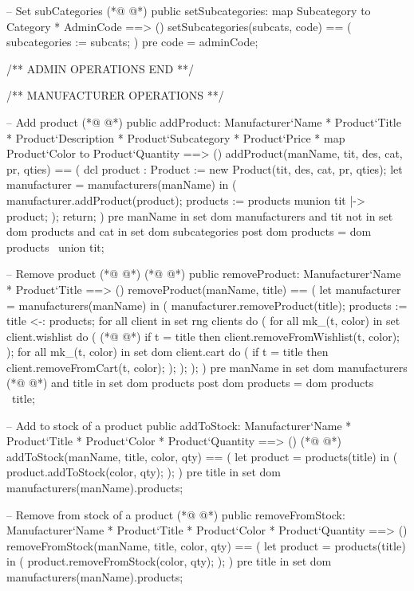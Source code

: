 \begin{vdmpp}[breaklines=true]
 -- Set subCategories
(*@
\label{setSubcategories:75}
@*)
 public setSubcategories: map Subcategory to Category * AdminCode ==> ()
 setSubcategories(subcats, code) == (
  subcategories := subcats;
 )
 pre code = adminCode;
 
 /** ADMIN OPERATIONS END **/
 
 
 /** MANUFACTURER OPERATIONS **/
 
 -- Add product
(*@
\label{addProduct:87}
@*)
 public addProduct: Manufacturer`Name * Product`Title * Product`Description * Product`Subcategory * Product`Price * map Product`Color to Product`Quantity ==> ()
 addProduct(manName, tit, des, cat, pr, qties) == (
  dcl product : Product := new Product(tit, des, cat, pr, qties);
  let manufacturer = manufacturers(manName)
   in (
    manufacturer.addProduct(product);
    products := products munion {tit |-> product};
   );
   return;
 )
 pre manName in set dom manufacturers
  and tit not in set dom products
  and cat in set dom subcategories
 post dom products = dom products~ union {tit};
 
 -- Remove product
(*@
\label{removeProduct:103}
@*)
(*@
\label{addToStock:103}
@*)
 public removeProduct: Manufacturer`Name * Product`Title ==> ()
 removeProduct(manName, title) == (
  let manufacturer = manufacturers(manName)
   in (
    manufacturer.removeProduct(title);
    products := {title} <-: products;
    for all client in set rng clients
    do (
     for all mk_(t, color) in set client.wishlist
     do (
(*@
\label{removeFromStock:113}
@*)
      if t = title then client.removeFromWishlist(t, color);
     );
     for all mk_(t, color) in set dom client.cart
     do (
      if t = title then client.removeFromCart(t, color);
     );
    );
  );
 )
 pre manName in set dom manufacturers
(*@
\label{setVolumeDiscounts:123}
@*)
  and title in set dom products
 post dom products = dom products~ \ {title};
 
 -- Add to stock of a product
 public addToStock: Manufacturer`Name * Product`Title * Product`Color * Product`Quantity ==> ()
(*@
\label{addToWishlist:128}
@*)
 addToStock(manName, title, color, qty) == (
  let product = products(title)
  in (
   product.addToStock(color, qty);
  );
 )
 pre title in set dom manufacturers(manName).products;
 
 -- Remove from stock of a product
(*@
\label{removeFromWishlist:137}
@*)
 public removeFromStock: Manufacturer`Name * Product`Title * Product`Color * Product`Quantity ==> ()
 removeFromStock(manName, title, color, qty) == (
  let product = products(title)
  in (
   product.removeFromStock(color, qty);
  );
 )
 pre title in set dom manufacturers(manName).products;
 

\end{vdmpp}

